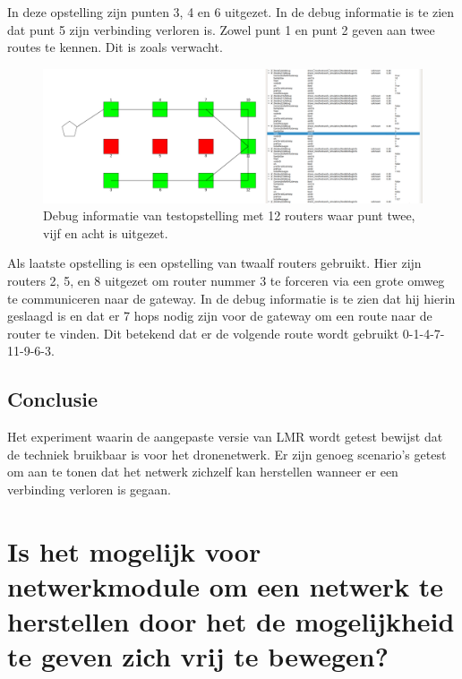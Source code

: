 \documentclass[a4paper, 11pt, oneside]{report}
\begin{document}
In deze opstelling zijn punten 3, 4 en 6 uitgezet. In de debug informatie is te zien dat punt 5 zijn verbinding verloren is.
Zowel punt 1 en punt 2 geven aan twee routes te kennen.
Dit is zoals verwacht.

\begin{figure}[H]
	\begin{center}\includegraphics[width=\linewidth]{Afbeeldingen/testopstelling2_met_twaalf_drie_routers_uit.png}\end{center}
	\caption{Debug informatie van testopstelling met 12 routers waar punt twee, vijf en acht is uitgezet.}
	\label{fig:applicatie-testopstelling-gateway-twaalf-routers}
\end{figure}

Als laatste opstelling is een opstelling van twaalf routers gebruikt.
Hier zijn routers 2, 5, en 8 uitgezet om router nummer 3 te forceren via een grote omweg te communiceren naar de gateway.
In de debug informatie is te zien dat hij hierin geslaagd is en dat er 7 hops nodig zijn voor de gateway om een route naar de router te vinden.
Dit betekend dat er de volgende route wordt gebruikt 0-1-4-7-11-9-6-3.

\subsection{Conclusie}

Het experiment waarin de aangepaste versie van LMR wordt getest bewijst dat de techniek bruikbaar is voor het dronenetwerk.
Er zijn genoeg scenario's getest om aan te tonen dat het netwerk zichzelf kan herstellen wanneer er een verbinding verloren is gegaan.

\section[Netwerkherstel door beweging  drone]{Is het mogelijk voor netwerkmodule om een netwerk te herstellen door het de mogelijkheid te geven zich vrij te bewegen?}
\label{experimenten:herstelnetwerk}
\end{document}
